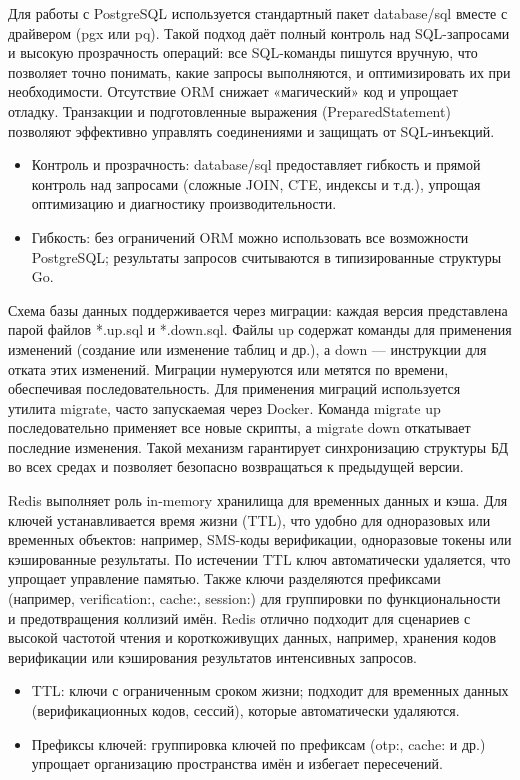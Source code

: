 Для работы с PostgreSQL используется стандартный пакет database/sql вместе с драйвером (pgx или pq). Такой подход даёт полный контроль над SQL-запросами и высокую прозрачность операций: все SQL-команды пишутся вручную, что позволяет точно понимать, какие запросы выполняются, и оптимизировать их при необходимости. Отсутствие ORM снижает «магический» код и упрощает отладку. Транзакции и подготовленные выражения (PreparedStatement) позволяют эффективно управлять соединениями и защищать от SQL-инъекций.

\begin{itemize}
    \item Контроль и прозрачность: database/sql предоставляет гибкость и прямой контроль над запросами (сложные JOIN, CTE, индексы и т.д.), упрощая оптимизацию и диагностику производительности.
    \item Гибкость: без ограничений ORM можно использовать все возможности PostgreSQL; результаты запросов считываются в типизированные структуры Go.
\end{itemize}

Схема базы данных поддерживается через миграции: каждая версия представлена парой файлов *.up.sql и *.down.sql. Файлы up содержат команды для применения изменений (создание или изменение таблиц и др.), а down — инструкции для отката этих изменений. Миграции нумеруются или метятся по времени, обеспечивая последовательность. Для применения миграций используется утилита migrate, часто запускаемая через Docker. Команда migrate up последовательно применяет все новые скрипты, а migrate down откатывает последние изменения. Такой механизм гарантирует синхронизацию структуры БД во всех средах и позволяет безопасно возвращаться к предыдущей версии.

Redis выполняет роль in-memory хранилища для временных данных и кэша. Для ключей устанавливается время жизни (TTL), что удобно для одноразовых или временных объектов: например, SMS-коды верификации, одноразовые токены или кэшированные результаты. По истечении TTL ключ автоматически удаляется, что упрощает управление памятью. Также ключи разделяются префиксами (например, verification:, cache:, session:) для группировки по функциональности и предотвращения коллизий имён. Redis отлично подходит для сценариев с высокой частотой чтения и короткоживущих данных, например, хранения кодов верификации или кэширования результатов интенсивных запросов.

\begin{itemize}
    \item TTL: ключи с ограниченным сроком жизни; подходит для временных данных (верификационных кодов, сессий), которые автоматически удаляются.
    \item Префиксы ключей: группировка ключей по префиксам (otp:, cache: и др.) упрощает организацию пространства имён и избегает пересечений.
\end{itemize}

